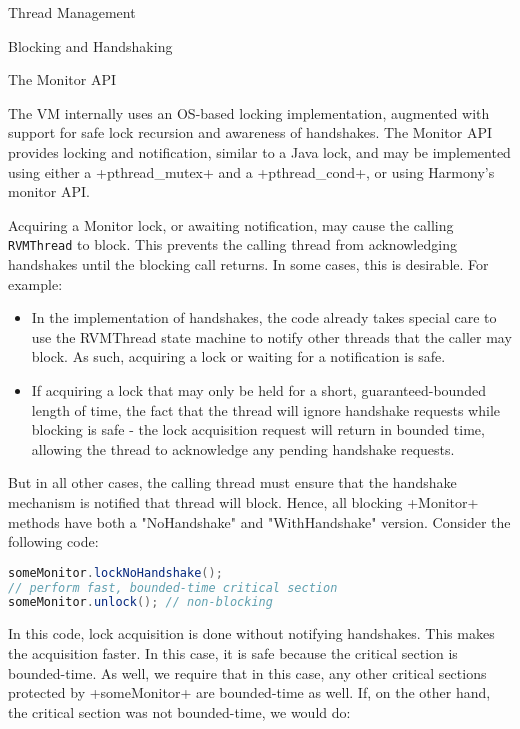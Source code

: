 \begin{section}{Thread Management}
\begin{subsection}{Blocking and Handshaking}
\end{subsection}

\begin{subsection}{The Monitor API}

The VM internally uses an OS-based locking implementation, augmented with support for safe lock recursion and awareness of handshakes. The Monitor API provides locking and notification, similar to a Java lock, and may be implemented using either a \spverb+pthread_mutex+ and a \spverb+pthread_cond+, or using Harmony's monitor API.

Acquiring a Monitor lock, or awaiting notification, may cause the calling \texttt{RVM\-Thread} to block. This prevents the calling thread from acknowledging handshakes until the blocking call returns. In some cases, this is desirable. For example:
\begin{itemize}
  \item In the implementation of handshakes, the code already takes special care to use the RVMThread state machine to notify other threads that the caller may block. As such, acquiring a lock or waiting for a notification is safe.
  \item If acquiring a lock that may only be held for a short, guaranteed-bounded length of time, the fact that the thread will ignore handshake requests while blocking is safe - the lock acquisition request will return in bounded time, allowing the thread to acknowledge any pending handshake requests.
\end{itemize}

But in all other cases, the calling thread must ensure that the handshake mechanism is notified that thread will block. Hence, all blocking \spverb+Monitor+ methods have both a "NoHandshake" and "WithHandshake" version. Consider the following code:

\begin{lstlisting}[language=Java]
someMonitor.lockNoHandshake();
// perform fast, bounded-time critical section
someMonitor.unlock(); // non-blocking
\end{lstlisting}

In this code, lock acquisition is done without notifying handshakes. This makes the acquisition faster. In this case, it is safe because the critical section is bounded-time. As well, we require that in this case, any other critical sections protected by \spverb+someMonitor+ are bounded-time as well. If, on the other hand, the critical section was not bounded-time, we would do:


\end{subsection}
\end{section}
